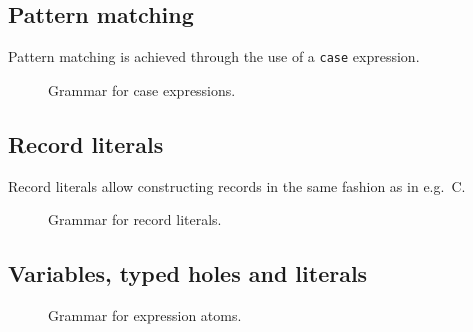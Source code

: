 \subsection{Pattern matching}\label{subsec:zilch-grammar-expressions-case}

Pattern matching is achieved through the use of a \texttt{case} expression.

\begin{figure}[H]
  \centering


  \caption{Grammar for case expressions.}
  \label{fig:zilch-gramma-expressions-case-grammar}
\end{figure}

\subsection{Record literals}\label{subsec:zilch-grammar-expressions-record}

Record literals allow constructing records in the same fashion as in e.g.\ C.

\begin{figure}[H]
  \centering


  \caption{Grammar for record literals.}
  \label{fig:zilch-gramma-expressions-record-grammar}
\end{figure}

\subsection{Variables, typed holes and literals}\label{subsec:zilch-grammar-expressions-basicexpr}

\begin{figure}[H]
  \centering


  \caption{Grammar for expression atoms.}
  \label{fig:zilch-grammar-expressions-atom-grammar}
\end{figure}

